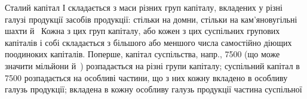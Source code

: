 Сталий капітал І складається з маси різних груп капіталу, вкладених
у різні галузі продукції засобів продукції: стільки на домни, стільки на
кам’яновугільні шахти й~ Кожна з цих груп капіталу, або кожен
з цих суспільних групових капіталів і собі складається з більшого або
меншого числа самостійно діющих поодиноких капіталів. Поперше, капітал
суспільства, напр., 7500 (що може значити мільйони й~) розпадається
на різні групи капіталу; суспільний капітал в 7500 розпадається
на особливі частини, що з них кожну вкладено в особливу галузь продукції;
вкладена в кожну особливу галузь продукції частина суспільної
\parbreak{}  %

